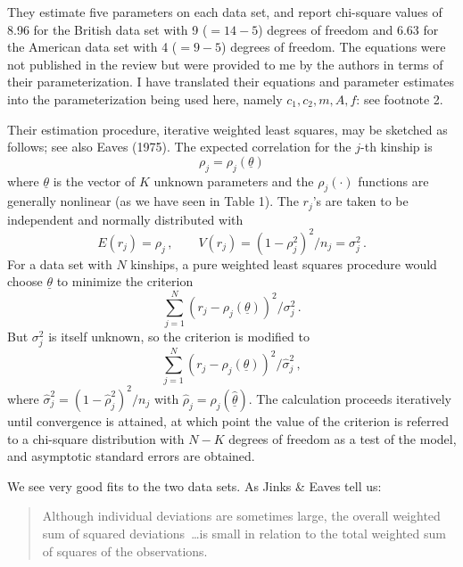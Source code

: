 ﻿\documentclass[12pt]{article}
\begin{document}
They estimate five parameters on each data set, and report chi-square values of 8.96 for the British data set with 9 ($=14-5$) degrees of freedom and 6.63 for the American data set with 4 ($=9-5$) degrees of freedom. The equations were not published in the review but were provided to me by the authors in terms of their parameterization. I have translated their equations and parameter estimates into the parameterization being used here, namely $c_1, c_2, m, A, f$: see footnote 2.

Their estimation procedure, iterative weighted least squares, may be sketched as follows; see also Eaves (1975). The expected correlation for the $j$-th kinship is
\begin{equation*}
\rho_j = \rho_j(\underline{\theta})
\end{equation*}
where $\underline{\theta}$ is the vector of $K$ unknown parameters and the $\rho_j(\cdot)$ functions are generally nonlinear (as we have seen in Table 1). The $r_j$'s are taken to be independent and normally distributed with
\begin{equation*}
E(r_j) = \rho_j \, , \qquad V(r_j) = (1-\rho_j^2)^2/n_j = \sigma_j^2 \, .
\end{equation*}
For a data set with $N$ kinships, a pure weighted least squares procedure would choose $\underline{\theta}$ to minimize the criterion
\begin{equation*}
\sum_{j=1}^{N} (r_j - \rho_j(\underline{\theta}))^2/\sigma_j^2 \, .
\end{equation*}
But $\sigma_j^2$ is itself unknown, so the criterion is modified to
\begin{equation*}
\sum_{j=1}^{N} (r_j - \rho_j(\underline{\theta}))^2/\hat\sigma_j^2 \, ,
\end{equation*}
where $\hat\sigma_j^2 = (1-\hat\rho_j^2)^2/n_j$ with $\hat\rho_j = \rho_j(\hat{\underline{\theta}})$. The calculation proceeds iteratively until convergence is attained, at which point the value of the criterion is referred to a chi-square distribution with $N-K$ degrees of freedom as a test of the model, and asymptotic standard errors are obtained.

We see very good fits to the two data sets. As Jinks \& Eaves tell us:

\begin{quote}
Although individual deviations are sometimes large, the overall weighted sum of squared deviations~\ldots is small in relation to the total weighted sum of squares of the observations.
\end{quote}
\end{document}
